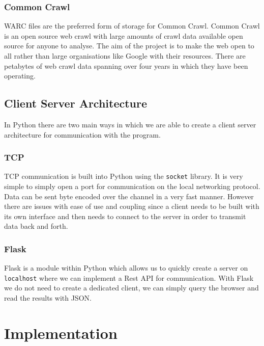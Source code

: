 \documentclass[12pt,twoside]{report}
\begin{document}
\subsection{Common Crawl}
WARC files are the preferred form of storage for Common Crawl. Common Crawl is an open source web crawl with large amounts of crawl data available open source for anyone to analyse. The aim of the project is to make the web open to all rather than large organisations like Google with their resources. There are petabytes of web crawl data spanning over four years in which they have been operating.
\section{Client Server Architecture}
In Python there are two main ways in which we are able to create a client server architecture for communication with the program.
\subsection{TCP}
TCP communication is built into Python using the \texttt{socket} library. It is very simple to simply open a port for communication on the local networking protocol. Data can be sent byte encoded over the channel in a very fast manner. However there are issues with ease of use and coupling since a client needs to be built with its own interface and then needs to connect to the server in order to transmit data back and forth.
\subsection{Flask}
Flask is a module within Python which allows us to quickly create a server on \texttt{localhost} where we can implement a Rest API for communication. With Flask we do not need to create a dedicated client, we can simply query the browser and read the results with JSON.

\chapter{Implementation}
\end{document}
